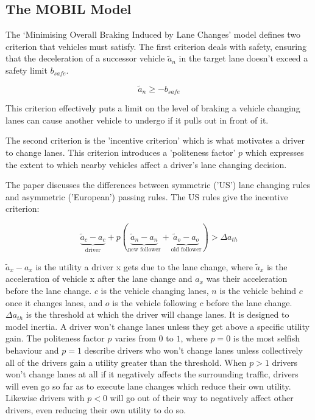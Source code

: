 \begin{appendices}
\subsection{The MOBIL Model}
\label{subsec:The MOBIL Model}
The `Minimising Overall Braking Induced by Lane Changes' model defines two criterion that vehicles must satisfy. The first criterion deals with safety, ensuring that the deceleration of a successor vehicle $\tilde{a}_n$ in the target lane doesn't exceed a safety limit $b_{safe}$.

\begin{equation}
\tilde{a}_n \geq -b_{safe}
\end{equation}

This criterion effectively puts a limit on the level of braking a vehicle changing lanes can cause another vehicle to undergo if it pulls out in front of it.

The second criterion is the 'incentive criterion' which is what motivates a driver to change lanes. This criterion introduces a 'politeness factor' $p$ which expresses the extent to which nearby vehicles affect a driver's lane changing decision. 

The paper discusses the differences between symmetric ('US') lane changing rules and asymmetric ('European') passing rules. The US rules give the incentive criterion:

\begin{equation}
\underbrace{\tilde{a}_c - a_c}_\text{driver} + p(\underbrace{\tilde{a}_n  - a_n}_\text{new follower} + \underbrace{\tilde{a}_o - a_o}_\text{old follower}) > \Delta a_{th}
\end{equation}

$\tilde{a}_x - a_x$ is the utility a driver x gets due to the lane change, where $\tilde{a}_x$ is the acceleration of vehicle x after the lane change and $a_x$ was their acceleration before the lane change. $c$ is the vehicle changing lanes, $n$ is the vehicle behind $c$ once it changes lanes, and $o$ is the vehicle following $c$ before the lane change. $\Delta a_{th}$ is the threshold at which the driver will change lanes. It is designed to model inertia. A driver won't change lanes unless they get above a specific utility gain. The politeness factor $p$ varies from $0$ to $1$, where $p = 0$ is the most selfish behaviour and $p = 1$ describe drivers who won't change lanes unless collectively all of the drivers gain a utility greater than the threshold. When $p > 1$ drivers won't change lanes at all if it negatively affects the surrounding traffic, drivers will even go so far as to execute lane changes which reduce their own utility. Likewise drivers with $p < 0$ will go out of their way to negatively affect other drivers, even reducing their own utility to do so.


\end{appendices}
